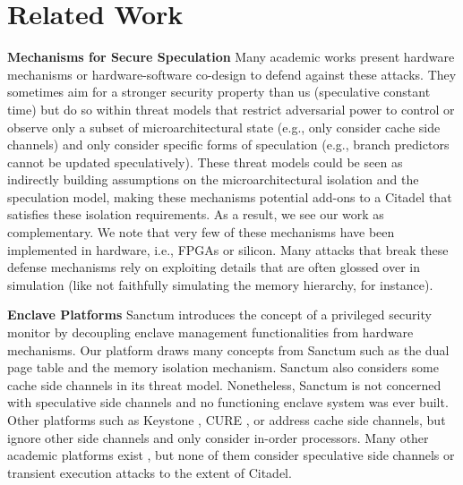 \section{Related Work}
\label{sec:relatedwork}
\textbf{Mechanisms for Secure Speculation}
Many academic works \cite{ainsworth2020muontrap, cheang2019formal, canella2019systematic, barber2019specshield, fustos2019spectreguard, yan2018invisispec, yu2019speculative, saileshwar2019cleanupspec, weisse2019nda, khasawneh2019safespec, loughlin2021dolma, ainsworth2021ghostminion} present hardware mechanisms or hardware-software co-design to defend against these attacks.
They sometimes aim for a stronger security property than us (speculative constant time) but do so within threat models that restrict adversarial power to control or observe only a subset of microarchitectural state (e.g., only consider cache side channels) and only consider specific forms of speculation (e.g., branch predictors cannot be updated speculatively).
These threat models could be seen as indirectly building assumptions on the microarchitectural isolation and the speculation model, making these mechanisms potential add-ons to a Citadel that satisfies these isolation requirements.
As a result, we see our work as complementary. We note that very few of these mechanisms have been implemented in hardware, i.e., FPGAs or silicon.
Many attacks that break these defense mechanisms rely on exploiting details that are often glossed over in simulation (like not faithfully simulating the memory hierarchy, for instance).

\noindent\textbf{Enclave Platforms}
Sanctum \cite{costan2016sanctum} introduces the concept of a privileged security monitor by decoupling enclave management functionalities from hardware mechanisms. 
Our platform draws many concepts from Sanctum such as the dual page table and the memory isolation mechanism. Sanctum also considers some cache side channels in its threat model.
Nonetheless, Sanctum is not concerned with speculative side channels and no functioning enclave system was ever built.
Other platforms such as Keystone \cite{lee2020keystone}, CURE \cite{bahmani2021cure}, or \cite{enclavecaches} address cache side channels, but ignore other side channels and only consider in-order processors. 
Many other academic platforms exist \cite{ferraiuolo2017komodo, feng2021scalable, weiser2019timber, mccune2008flicker, azab2011sice, xia2013architecture, deng2014equalvisor, brasser2019sanctuary, sun2015trustice, koeberl2014trustlite, aegis, xom}, but none of them consider speculative side channels or transient execution attacks to the extent of Citadel. 


